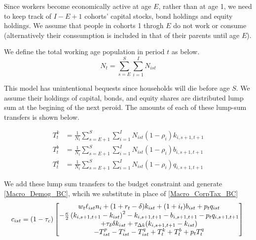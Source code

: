 \documentclass[letterpaper,12pt]{article}
\theoremstyle{definition}
\numberwithin{equation}{section}
\begin{document}
\begin{spacing}{1.5}
    Since workers become economically active at age $E$, rather than at age 1, we need to keep track of $I-E+1$ cohorts' capital stocks, bond holdings and equity holdings.  We assume that people in cohorts 1 throgh $E$ do not work or consume (alternatively their conssumption is included in that of their parents until age $E$).

    We define the total working age population in period $t$ as below.
    \begin{equation}
    N_t = \sum_{s=E}^S \sum_{i=1}^I N_{ist}
    \end{equation}

    This model has unintentional bequests since households will die before age $S$.  We assume their holdings of capital, bonds, and equity shares are distributed lump sum at the begining of the next peroid.  The amounts of each of these lump-sum transfers is shown below.

    \begin{align}
    T^k_t & = \frac{1}{N_t}\sum_{s=E+1}^S \sum_{i=1}^I N_{ist} (1-\rho_i) k_{i,s+1,t+1} \\
    T^b_t & = \frac{1}{N_t}\sum_{s=E+1}^S \sum_{i=1}^I N_{ist} (1-\rho_i) b_{i,s+1,t+1} \\
    T^q_t & = \frac{1}{N_t}\sum_{s=E+1}^S \sum_{i=1}^I N_{ist} (1-\rho_i) q_{i,s+1,t+1}
    \end{align}

    We add these lump sum transfers to the budget constraint and generate \eqref{Macro_Demog_BC}, whcih we substitute in place of \eqref{Macro_CorpTax_BC}
    \begin{equation} \label{Macro_Demog_BC}
    c_{ist} = (1-\tau_c)\begin{bmatrix} w_t \ell_{ist} n_i + (1+r_t-\delta)k_{ist} + (1+i_t)b_{ist} + p_t q_{ist} \\
      - \tfrac{\kappa}{2}\left(k_{i,s+1,t+1} - k_{ist}\right)^2 - k_{i,s+1,t+1} - b_{i,s+1,t+1} - p_t q_{i,s+1,t+1} \\
      +\tau_\delta \delta k_{ist} + \tau_{\Delta k} (k_{i,s+1,t+1} - k_{ist}) \\
      - T^p_{ist} - T^i_{ist} - T^q_{ist} + T^k_t + T^b_t + p_tT^q_t\end{bmatrix} \\
    \end{equation}


\end{spacing}
\end{document}
